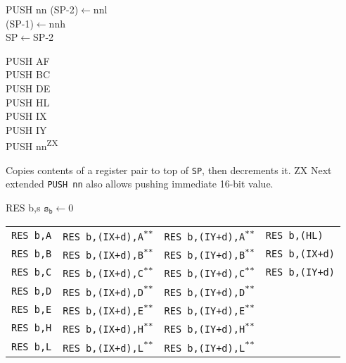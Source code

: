 \documentclass[twoside,openright,a4paper]{book}
\newcommand{\UNDOC}{\textnormal{\textsuperscript{**}}}
\newcommand{\ZXN}{\textnormal{\textsuperscript{ZX}}}
\begin{document}
\begin{basedescript}{
	\desclabelstyle{\multilinelabel}
	\desclabelwidth{3cm}}
	\begin{detailitem}{PUSH nn}
		{(SP-2)$\leftarrow$nnl\\
		(SP-1)$\leftarrow$nnh\\
		SP$\leftarrow$SP-2}

		\begin{DetailVariants}
			PUSH AF\\
			PUSH BC\\
			PUSH DE\\
			PUSH HL\\
			PUSH IX\\
			PUSH IY\\
			PUSH nn\ZXN
		\end{DetailVariants}

		Copies contents of a register pair to top of {\tt SP}, then decrements it. ZX Next extended {\tt PUSH nn} also allows pushing immediate 16-bit value.

		\DetailNoEffect
				
		\begin{DetailTiming}
		\end{DetailTiming}

	\end{detailitem}

	\begin{detailitem}{RES b,s}
		{$\mathtt{s_b}\leftarrow$0}

		\begin{tabularx}{0.8\textwidth}{@{}p{1.8cm}XXp{2.6cm}}
			{\tt RES b,A} &
				{\tt RES b,(IX+d),A\UNDOC} &
				{\tt RES b,(IY+d),A\UNDOC} &
				{\tt RES b,(HL)} \\
			{\tt RES b,B} &
				{\tt RES b,(IX+d),B\UNDOC} &
				{\tt RES b,(IY+d),B\UNDOC} &
				{\tt RES b,(IX+d)} \\
			{\tt RES b,C} &
				{\tt RES b,(IX+d),C\UNDOC} &
				{\tt RES b,(IY+d),C\UNDOC} &
				{\tt RES b,(IY+d)} \\
			{\tt RES b,D} &
				{\tt RES b,(IX+d),D\UNDOC} &
				{\tt RES b,(IY+d),D\UNDOC} \\
			{\tt RES b,E} &
				{\tt RES b,(IX+d),E\UNDOC} &
				{\tt RES b,(IY+d),E\UNDOC}\\
			{\tt RES b,H} &
				{\tt RES b,(IX+d),H\UNDOC} &
				{\tt RES b,(IY+d),H\UNDOC} \\
			{\tt RES b,L} &
				{\tt RES b,(IX+d),L\UNDOC} &
				{\tt RES b,(IY+d),L\UNDOC} \\
		\end{tabularx}


\end{detailitem}
\end{basedescript}
\end{document}

